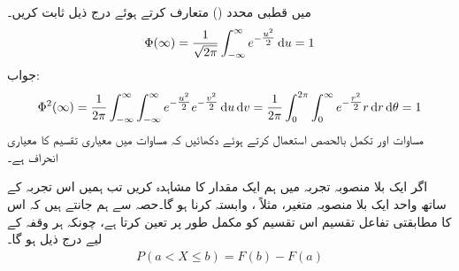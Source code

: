 \quad
{} میں قطبی محدد () متعارف کرتے ہوئے درج ذیل ثابت کریں۔
\begin{align}\label{مساوات_شماریات_سوال_مساوات}
\Phi(\infty)=\frac{1}{\sqrt{2\pi}}\int_{-\infty}^{\infty} e^{-\tfrac{u^2}{2}}\dif u=1
\end{align}
جواب:\quad
\begin{align*}
\Phi^2(\infty)=\frac{1}{2\pi}\int_{-\infty}^{\infty}\int_{-\infty}^{\infty}e^{-\tfrac{u^2}{2}}e^{-\tfrac{v^2}{2}}\dif u\dif v=\frac{1}{2\pi}\int_{0}^{2\pi}\int_{0}^{\infty} e^{-\tfrac{r^2}{2}}r\dif r \dif \theta=1
\end{align*}
\quad
مساوات  اور تکمل بالحصص استعمال کرتے ہوئے دکھائیں کہ مساوات  میں  معیاری تقسیم کا  معیاری انحراف ہے۔

اگر ایک بلا منصوبہ تجربہ میں ہم ایک مقدار کا مشاہدہ کریں تب ہمیں اس تجربہ کے ساتھ واحد ایک بلا منصوبہ متغیر، مثلاً ، وابستہ کرنا ہو گا۔حصہ  سے ہم جانتے ہیں کہ اس کا مطابقتی تفاعل تقسیم  اس تقسیم کو مکمل طور پر تعین کرتا ہے، چونکہ ہر وقفہ  کے لیے درج ذیل ہو گا۔
\begin{align*}
P(a<X\le b)=F(b)-F(a)
\end{align*}

